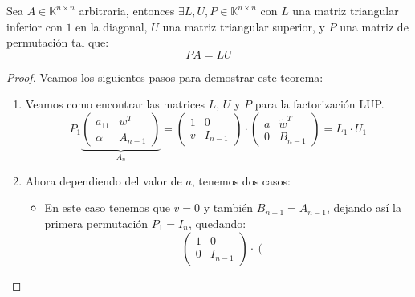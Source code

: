 \begin{teorema}
    Sea $A \in \mathbb{K}^{n \times n}$ arbitraria, entonces $\exists L, U, P \in \mathbb{K}^{n \times n}$ con $L$ una matriz triangular inferior con $1$ en la diagonal, $U$ una matriz triangular superior, y $P$ una matriz de permutación tal que:
    \[
        PA = LU
    \]
\end{teorema}

\begin{proof}
    Veamos los siguientes pasos para demostrar este teorema:
    \begin{enumerate}
        \item Veamos como encontrar las matrices $L$, $U$ y $P$ para la factorización LUP.\\
        \[
            P_1
            \underbrace{
                \left(
                    \begin{array}{c|c}
                        a_{11} & w^T \\ \hline
                        \alpha & A_{n-1}
                    \end{array}
                \right)
            }_{A_n} =
            \left(
                \begin{array}{c|c}
                    1 & 0 \\ \hline
                    v & I_{n-1}
                \end{array}
            \right) \cdot
            \left(
                \begin{array}{c|c}
                    a & \widetilde{w}^T \\ \hline
                    0 & B_{n-1}
                \end{array}
            \right) =
            L_1 \cdot U_1
        \]
        \item Ahora dependiendo del valor de $a$, tenemos dos casos:
        \begin{itemize}
            \item[$a=0$] En este caso tenemos que $v=0$ y también $B_{n-1} = A_{n-1}$, dejando así la primera permutación $P_1 = I_n$, quedando:
            \[
                \left(
                    \begin{array}{c|c}
                        1 & 0 \\ \hline
                        0 & I_{n-1}
                    \end{array}
                \right) \cdot
                \left(
                    \begin{array}{c|c}

\end{array}\]
\end{itemize}
\end{enumerate}
\end{proof}
